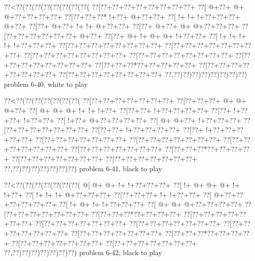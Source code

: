 \vbox{\vbox{\goo
\0??<\0??(\0??(\0??(\0??(\0??(\0??(\0??(\0??(
\0??[\0??+\0??+\0??+\0??+\0??+\0??+\0??+\0??+
\0??[\- @+\0??+\- @+\- @+\0??+\0??+\0??+\0??+
\0??[\0??+\0??+\0??*\- !+\0??+\- @+\0??+\0??+
\0??[\- !+\- !+\- !+\0??+\0??+\0??+\- @+\0??+
\0??[\0??+\- @+\0??+\- !+\- !+\- @+\0??+\0??+
\0??[\0??+\- @+\0??+\- @+\- @+\0??+\0??+\0??+
\0??[\0??+\0??+\0??+\0??+\0??+\0??+\- @+\0??+
\0??[\0??+\- @+\- !+\- @+\- @+\- !+\0??+\0??+
\0??[\- !+\- !+\- !+\- !+\- !+\0??+\0??+\0??+
\0??[\0??+\0??+\0??+\0??+\0??+\0??+\0??+\0??+
\0??[\0??+\0??+\0??+\0??+\0??+\0??+\0??+\0??+
\0??[\0??+\0??+\0??+\0??+\0??+\0??+\0??+\0??+
\0??[\0??+\0??+\0??+\0??+\0??+\0??+\0??+\0??+
\0??[\0??+\0??+\0??+\0??+\0??+\0??+\0??+\0??+
\0??[\0??+\0??+\0??*\0??+\0??+\0??+\0??+\0??+
\0??[\0??+\0??+\0??+\0??+\0??+\0??+\0??+\0??+
\0??[\0??+\0??+\0??+\0??+\0??+\0??+\0??+\0??+
\0??,\0??)\0??)\0??)\0??)\0??)\0??)\0??)\0??)
}
\hfil problem 6-40, white to play\hfil\break
}

\vbox{\vbox{\goo
\0??<\0??(\0??(\0??(\0??(\0??(\0??(\0??(
\0??[\0??+\0??+\0??+\0??+\0??+\0??+\0??+
\0??[\0??+\0??+\0??+\- @+\- @+\- @+\0??+
\0??[\- @+\- @+\- @+\- !+\- !+\- !+\0??+
\0??[\0??+\0??+\- !+\0??+\0??+\0??+\0??+
\0??[\0??+\- !+\0??+\0??+\- !+\0??+\0??+
\0??[\- !+\0??+\- @+\0??+\0??+\0??+\0??+
\0??[\- @+\- @+\0??+\- !+\0??+\0??+\0??+
\0??[\0??+\0??+\0??+\0??+\0??+\0??+\0??+
\0??[\0??+\0??+\- !+\0??+\0??+\0??+\0??+
\0??[\0??+\- !+\0??+\0??+\0??+\0??+\0??+
\0??[\0??+\0??+\0??+\0??+\0??+\0??+\0??+
\0??[\0??+\0??+\0??+\0??+\0??+\0??+\0??+
\0??[\0??+\0??+\0??+\0??+\0??+\0??+\0??+
\0??[\0??+\0??+\0??+\0??+\0??+\0??+\0??+
\0??[\0??+\0??+\0??*\0??+\0??+\0??+\0??+
\0??[\0??+\0??+\0??+\0??+\0??+\0??+\0??+
\0??[\0??+\0??+\0??+\0??+\0??+\0??+\0??+
\0??,\0??)\0??)\0??)\0??)\0??)\0??)\0??)
}
\hfil problem 6-41, black to play\hfil\break
}

\vbox{\vbox{\goo
\0??<\0??(\0??(\0??(\0??(\0??(\0??(\0??(
\- @[\- @+\- @+\- !+\- !+\0??+\0??+\0??+
\0??[\- !+\- @+\- @+\- @+\- !+\- !+\0??+
\0??[\- !+\- !+\- !+\- @+\0??+\0??+\0??+
\0??[\0??+\0??+\0??+\- !+\- !+\0??+\0??+
\0??[\- @+\0??+\0??+\0??+\0??+\0??+\0??+
\0??[\- !+\- @+\- !+\- !+\0??+\0??+\0??+
\0??[\- @+\- @+\- @+\0??+\0??+\0??+\0??+
\0??[\0??+\0??+\0??+\0??+\0??+\0??+\0??+
\0??[\0??+\0??+\0??*\0??+\0??+\0??+\0??+
\0??[\0??+\0??+\0??+\0??+\0??+\0??+\0??+
\0??[\0??+\0??+\0??+\0??+\0??+\0??+\0??+
\0??[\0??+\0??+\0??+\0??+\0??+\0??+\0??+
\0??[\0??+\0??+\0??+\0??+\0??+\0??+\0??+
\0??[\0??+\0??+\0??+\0??+\0??+\0??+\0??+
\0??[\0??+\0??+\0??*\0??+\0??+\0??+\0??+
\0??[\0??+\0??+\0??+\0??+\0??+\0??+\0??+
\0??[\0??+\0??+\0??+\0??+\0??+\0??+\0??+
\0??,\0??)\0??)\0??)\0??)\0??)\0??)\0??)
}
\hfil problem 6-42, black to play\hfil\break
}

